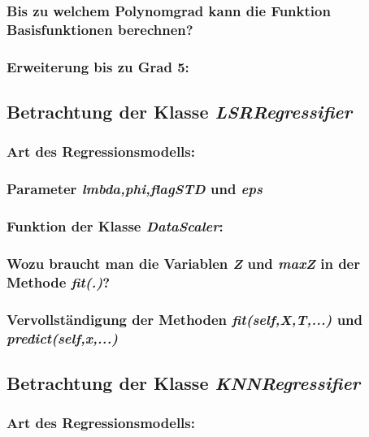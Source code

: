 \subsubsection{ Bis zu welchem Polynomgrad kann die Funktion Basisfunktionen berechnen? }

\subsubsection{ Erweiterung bis zu Grad 5: }

\subsection{
    Betrachtung der Klasse \textit{LSRRegressifier}
}

\subsubsection{ Art des Regressionsmodells: }

\subsubsection{ Parameter \textit{lmbda,phi,flagSTD} und \textit{eps} }

\subsubsection{ Funktion der Klasse \textit{DataScaler}: }

\subsubsection{ Wozu braucht man die Variablen \textit{Z} und \textit{maxZ} in der Methode \textit{fit(.)}? }

\subsubsection{ Vervollständigung der Methoden \textit{fit(self,X,T,...)} und \textit{predict(self,x,...)} }

\subsection{
    Betrachtung der Klasse \textit{KNNRegressifier}
}

\subsubsection{ Art des Regressionsmodells: }

